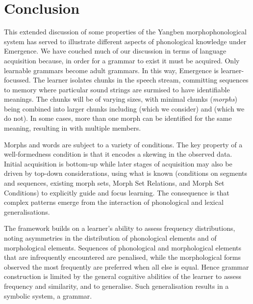 \section{Conclusion}
\largerpage
This extended discussion of some properties of the Yangben  morphophonological system has served to illustrate different aspects of  phonological knowledge under Emergence. 
We have couched much of our discussion in terms of language acquisition because, in order for a grammar to exist it must be acquired. Only learnable grammars become adult grammars. In this way, Emergence is learner-focussed. The learner isolates chunks in the speech stream, committing sequences to memory where particular sound strings are surmised to have identifiable meanings. The chunks will be of varying sizes, with minimal chunks ({\it morphs}) being combined into larger chunks including  (which we consider) and  (which we do not). In some cases, more than one morph can be identified for the same meaning, resulting in  with multiple members. 

Morphs and words are subject to a variety of conditions. The key property of a well-formedness condition is that it encodes a skewing in the observed data. Initial acquisition is bottom-up while later stages of acquisition may also be driven by top-down considerations, using what is known (conditions on segments and sequences, existing morph sets, Morph Set Relations, and Morph Set Conditions) to explicitly guide and focus learning.  The consequence is that complex patterns emerge from the interaction of phonological and lexical generalisations. 

The framework builds on a learner's ability to assess frequency distributions, noting asymmetries in the distribution of phonological elements and of morphological elements. Sequences of phonological and morphological elements that are infrequently encountered are penalised, while the morphological forms observed the most frequently are preferred when all else is equal.  Hence grammar construction is limited by the general cognitive abilities of the learner to assess frequency and similarity, and to generalise. Such generalisation results in a symbolic system, a grammar. 

